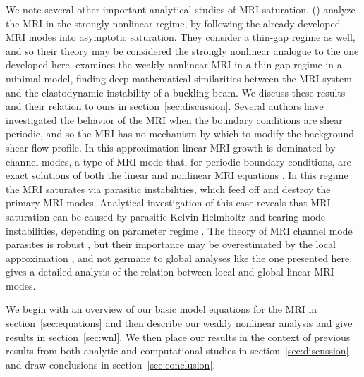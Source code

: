 \documentclass[twocolumn]{aastex61}
\begin{document}
We note several other important analytical studies of MRI saturation. \citeauthor{Knobloch:2005ba} (\citeyear{Knobloch:2005ba}) analyze the MRI in the strongly nonlinear regime, by following the already-developed MRI modes into asymptotic saturation. They consider a thin-gap regime as well, and so their theory may be considered the strongly nonlinear analogue to the one developed here. \citet{Vasil:2015} examines the weakly nonlinear MRI in a thin-gap regime in a minimal model, finding deep mathematical similarities between the MRI system and the elastodynamic instability of a buckling beam. We discuss these results and their relation to ours in section~\ref{sec:discussion}. Several authors have investigated the behavior of the MRI when the boundary conditions are shear periodic, and so the MRI has no mechanism by which to modify the background shear flow profile. In this approximation linear MRI growth is dominated by channel modes, a type of MRI mode that, for periodic boundary conditions, are exact solutions of both the linear and nonlinear MRI equations \citep{Goodman:1994ul}. In this regime the MRI saturates via parasitic instabilities, which feed off and destroy the primary MRI modes. Analytical investigation of this case reveals that MRI saturation can be caused by parasitic Kelvin-Helmholtz and tearing mode instabilities, depending on parameter regime \citep{Pessah:2010ic}. The theory of MRI channel mode parasites is robust \citep[see also][]{Pessah:2009gm,Latter:2010iz,Rembiasz:2016}, but their importance may be overestimated by the local approximation \citep{Latter:2015}, and not germane to global analyses like the one presented here. \citet{Latter:2015} gives a detailed analysis of the relation between local and global linear MRI modes. 

We begin with an overview of our basic model equations for the  MRI in section~\ref{sec:equations} and then describe our weakly nonlinear analysis and give results  in section~\ref{sec:wnl}.  We then place our results in the context of previous results from both analytic and computational studies in section~\ref{sec:discussion} and draw conclusions in section~\ref{sec:conclusion}.
\end{document}
